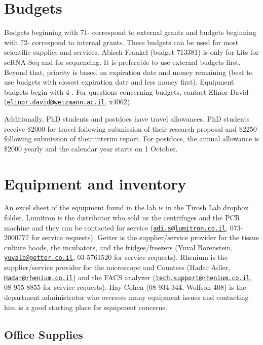 \documentclass[]{book}
\begin{document}
\chapter{Budgets}\label{budgets}

Budgets beginning with 71- correspond to external grants and budgets
beginning with 72- correspond to internal grants. These budgets can be
used for most scientific supplies and services. Abisch Frankel (budget
713381) is only for kits for scRNA-Seq and for sequencing. It is
preferable to use external budgets first. Beyond that, priority is based
on expiration date and money remaining (best to use budgets with closest
expiration date and less money first). Equipment budgets begin with 4-.
For questions concerning budgets, contact Elinor David
(\href{mailto:elinor.david@weizmann.ac.il}{\nolinkurl{elinor.david@weizmann.ac.il}},
x4062).

Additionally, PhD students and postdocs have travel allowances. PhD
students receive \$2000 for travel following submission of their
research proposal and \$2250 following submission of their interim
report. For postdocs, the annual allowance is \$2000 yearly and the
calendar year starts on 1 October.

\chapter{Equipment and inventory}\label{equipment}

An excel sheet of the equipment found in the lab is in the Tirosh Lab
dropbox folder. Lumitron is the distributor who sold us the centrifuges
and the PCR machine and they can be contacted for service
(\href{mailto:adi.s@lumitron.co.il}{\nolinkurl{adi.s@lumitron.co.il}},
073-2000777 for service requests). Getter is the supplier/service
provider for the tissue culture hoods, the incubators, and the
fridges/freezers (Yuval Borenstein,
\href{mailto:yuvalb@getter.co.il}{\nolinkurl{yuvalb@getter.co.il}},
03-5761520 for service requests). Rhenium is the supplier/service
provider for the microscope and Countess (Hadar Adler,
\href{mailto:Hadar@rhenium.co.il}{\nolinkurl{Hadar@rhenium.co.il}}) and
the FACS analyzer
(\href{mailto:tech.support@rhenium.co.il}{\nolinkurl{tech.support@rhenium.co.il}},
08-955-8855 for service requests). Hay Cohen (08-934-344, Wolfson 408)
is the department administrator who oversees many equipment issues and
contacting him is a good starting place for equipment concerns.

\section{Office Supplies}\label{office-supplies-1}
\end{document}
